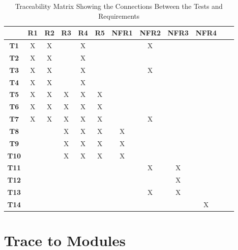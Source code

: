 \documentclass[12pt, titlepage]{article}
\begin{document}
\begin{table}[h!]
  \centering
  \begin{tabular}{|c|c|c|c|c|c|c|c|c|c|c|c|}
  \hline
    & R1
    & R2
    & R3
    & R4
    & R5
    & NFR1
    & NFR2
    & NFR3
    & NFR4
  \\ \hline
  \textbf{T1}          &X&X& &X& & &X& & \\ \hline
  \textbf{T2}            &X&X& &X& & & & & \\ \hline
  \textbf{T3}           &X&X& &X& & &X& & \\ \hline
  \textbf{T4}            &X&X& &X& & & & & \\ \hline
  \textbf{T5}          &X&X&X&X&X& & & & \\ \hline
  \textbf{T6}           &X&X&X&X&X& & & & \\ \hline
  \textbf{T7}           &X&X&X&X&X& &X& & \\ \hline
  \textbf{T8}            & & &X&X&X&X& & & \\ \hline
  \textbf{T9}             & & &X&X&X&X& & & \\ \hline
  \textbf{T10}            & & &X&X&X&X& & & \\ \hline
  \textbf{T11}      & & & & & & &X&X& \\ \hline
  \textbf{T12}               & & & & & & & &X& \\ \hline
  \textbf{T13}            & & & & & & &X&X& \\ \hline
  \textbf{T14}          & & & & & & & & &X\\ \hline
  \end{tabular}
  \caption{Traceability Matrix Showing the Connections Between the Tests and Requirements}
  \label{Table:A_trace}
\end{table}
		
\section{Trace to Modules}
\end{document}
